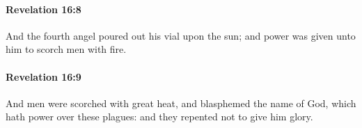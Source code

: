		\paragraph{Revelation 16:8} %
			\label{REVELATIONNT-16-8}

			And the fourth angel poured out his vial upon the sun; and power was given unto him to scorch men with fire.

			\begin{framed}
			\scriptsize
				\begin{compactdesc}
					\item[SBLG] 
				\end{compactdesc}
			\end{framed}

		\paragraph{Revelation 16:9} %
			\label{REVELATIONNT-16-9}

			And men were scorched with great heat, and blasphemed the name of God, which hath power over these plagues: and they repented not to give him glory.


